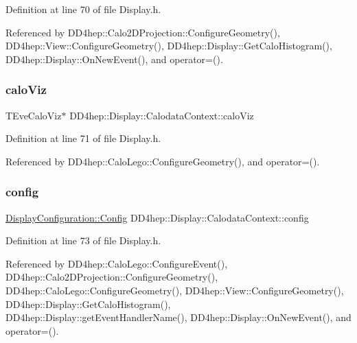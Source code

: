 Definition at line 70 of file Display.\+h.



Referenced by D\+D4hep\+::\+Calo2\+D\+Projection\+::\+Configure\+Geometry(), D\+D4hep\+::\+View\+::\+Configure\+Geometry(), D\+D4hep\+::\+Display\+::\+Get\+Calo\+Histogram(), D\+D4hep\+::\+Display\+::\+On\+New\+Event(), and operator=().

\hypertarget{struct_d_d4hep_1_1_display_1_1_calodata_context_af3730c667ed35846cfeb83eb21410cca}{}\label{struct_d_d4hep_1_1_display_1_1_calodata_context_af3730c667ed35846cfeb83eb21410cca} 
\subsubsection{\texorpdfstring{calo\+Viz}{caloViz}}
{\footnotesize\ttfamily T\+Eve\+Calo\+Viz$\ast$ D\+D4hep\+::\+Display\+::\+Calodata\+Context\+::calo\+Viz}



Definition at line 71 of file Display.\+h.



Referenced by D\+D4hep\+::\+Calo\+Lego\+::\+Configure\+Geometry(), and operator=().

\hypertarget{struct_d_d4hep_1_1_display_1_1_calodata_context_ad05be864371ffba5b06eadcb9be8511b}{}\label{struct_d_d4hep_1_1_display_1_1_calodata_context_ad05be864371ffba5b06eadcb9be8511b} 
\subsubsection{\texorpdfstring{config}{config}}
{\footnotesize\ttfamily \hyperlink{class_d_d4hep_1_1_display_configuration_1_1_config}{Display\+Configuration\+::\+Config} D\+D4hep\+::\+Display\+::\+Calodata\+Context\+::config}



Definition at line 73 of file Display.\+h.



Referenced by D\+D4hep\+::\+Calo\+Lego\+::\+Configure\+Event(), D\+D4hep\+::\+Calo2\+D\+Projection\+::\+Configure\+Geometry(), D\+D4hep\+::\+Calo\+Lego\+::\+Configure\+Geometry(), D\+D4hep\+::\+View\+::\+Configure\+Geometry(), D\+D4hep\+::\+Display\+::\+Get\+Calo\+Histogram(), D\+D4hep\+::\+Display\+::get\+Event\+Handler\+Name(), D\+D4hep\+::\+Display\+::\+On\+New\+Event(), and operator=().

